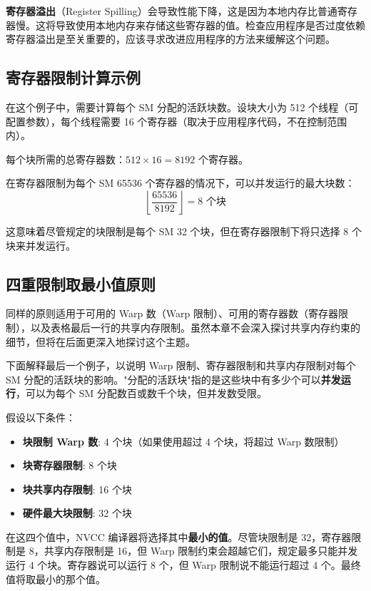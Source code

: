 \textbf{寄存器溢出}（Register Spilling）会导致性能下降，这是因为本地内存比普通寄存器慢。这将导致使用本地内存来存储这些寄存器的值。检查应用程序是否过度依赖寄存器溢出是至关重要的，应该寻求改进应用程序的方法来缓解这个问题。

\subsection{寄存器限制计算示例}

在这个例子中，需要计算每个 SM 分配的活跃块数。设块大小为 512 个线程（可配置参数），每个线程需要 16 个寄存器（取决于应用程序代码，不在控制范围内）。

每个块所需的总寄存器数：$512 \times 16 = 8192$ 个寄存器。

在寄存器限制为每个 SM 65536 个寄存器的情况下，可以并发运行的最大块数：
\[\left\lfloor \frac{65536}{8192} \right\rfloor = 8 \text{ 个块}\]

这意味着尽管规定的块限制是每个 SM 32 个块，但在寄存器限制下将只选择 8 个块来并发运行。

\subsection{四重限制取最小值原则}

同样的原则适用于可用的 Warp 数（Warp 限制）、可用的寄存器数（寄存器限制），以及表格最后一行的共享内存限制。虽然本章不会深入探讨共享内存约束的细节，但将在后面更深入地探讨这个主题。

下面解释最后一个例子，以说明 Warp 限制、寄存器限制和共享内存限制对每个 SM 分配的活跃块的影响。"分配的活跃块"指的是这些块中有多少个可以\textbf{并发运行}，可以为每个 SM 分配数百或数千个块，但并发数受限。

假设以下条件：
\begin{itemize}
    \item \textbf{块限制 Warp 数}: 4 个块（如果使用超过 4 个块，将超过 Warp 数限制）
    \item \textbf{块寄存器限制}: 8 个块
    \item \textbf{块共享内存限制}: 16 个块
    \item \textbf{硬件最大块限制}: 32 个块
\end{itemize}

在这四个值中，NVCC 编译器将选择其中\textbf{最小的值}。尽管块限制是 32，寄存器限制是 8，共享内存限制是 16，但 Warp 限制约束会超越它们，规定最多只能并发运行 4 个块。寄存器说可以运行 8 个，但 Warp 限制说不能运行超过 4 个。最终值将取最小的那个值。

